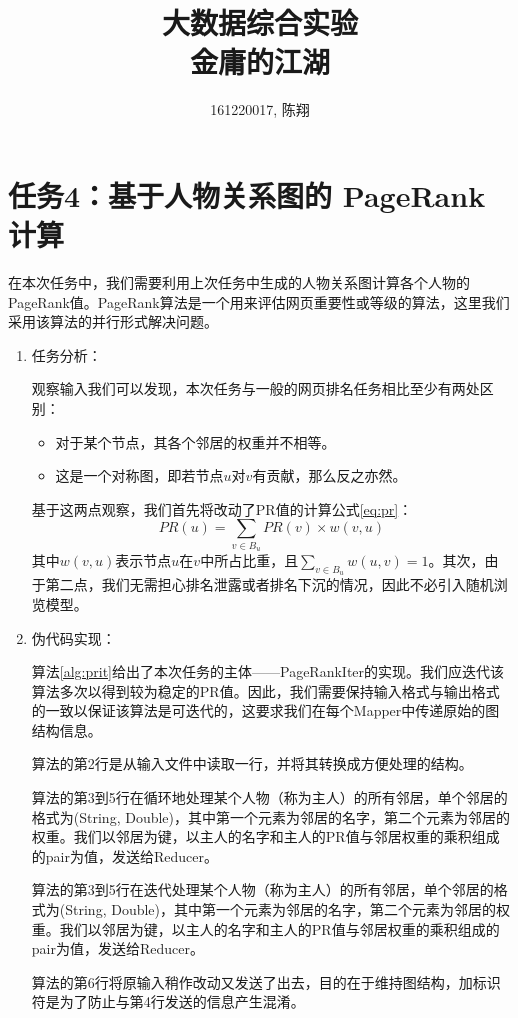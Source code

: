 \documentclass[a4paper,UTF8]{article}
\numberwithin{equation}{section}
\begin{document}
	\title{大数据综合实验\\
		金庸的江湖}
	\author{161220017, 陈翔}
	\maketitle
	\section{任务4：基于人物关系图的 PageRank 计算}
	在本次任务中，我们需要利用上次任务中生成的人物关系图计算各个人物的PageRank值。PageRank算法是一个用来评估网页重要性或等级的算法，这里我们采用该算法的并行形式解决问题。
	\begin{enumerate}[ {(}1{)}]
		\item 任务分析：
		
		观察输入我们可以发现，本次任务与一般的网页排名任务相比至少有两处区别：
		\begin{itemize}
			\item 对于某个节点，其各个邻居的权重并不相等。
			\item 这是一个对称图，即若节点$u$对$v$有贡献，那么反之亦然。
		\end{itemize}
		基于这两点观察，我们首先将改动了PR值的计算公式\ref{eq:pr}：
		$$
			\label{eq:pr} PR(u)=\sum_{v \in B_u} PR(v) \times w(v,u)
		$$
		其中$w(v,u)$表示节点$u$在$v$中所占比重，且$\sum_{v \in B_u}w(u,v) = 1$。其次，由于第二点，我们无需担心排名泄露或者排名下沉的情况，因此不必引入随机浏览模型。
		
		\item 伪代码实现：
		
		算法\ref{alg:prit}给出了本次任务的主体——PageRankIter的实现。我们应迭代该算法多次以得到较为稳定的PR值。因此，我们需要保持输入格式与输出格式的一致以保证该算法是可迭代的，这要求我们在每个Mapper中传递原始的图结构信息。
		
		算法的第2行是从输入文件中读取一行，并将其转换成方便处理的结构。
		
		算法的第3到5行在循环地处理某个人物（称为主人）的所有邻居，单个邻居的格式为(String, Double)，其中第一个元素为邻居的名字，第二个元素为邻居的权重。我们以邻居为键，以主人的名字和主人的PR值与邻居权重的乘积组成的pair为值，发送给Reducer。
		
		算法的第3到5行在迭代处理某个人物（称为主人）的所有邻居，单个邻居的格式为(String, Double)，其中第一个元素为邻居的名字，第二个元素为邻居的权重。我们以邻居为键，以主人的名字和主人的PR值与邻居权重的乘积组成的pair为值，发送给Reducer。
		
		算法的第6行将原输入稍作改动又发送了出去，目的在于维持图结构，加标识符是为了防止与第4行发送的信息产生混淆。
		

\end{enumerate}
\end{document}
